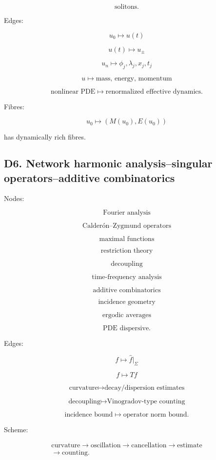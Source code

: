 \documentclass[11pt]{article}
\begin{document}
\[
\text{solitons}.
\]

Edges:

\[
u_0\mapsto u(t)
\]

\[
u(t)\mapsto u_\pm
\]

\[
u_n\mapsto {\phi_j,\lambda_j,x_j,t_j}
\]

\[
u\mapsto \text{mass, energy, momentum}
\]

\[
\text{nonlinear PDE}\mapsto \text{renormalized effective dynamics}.
\]

Fibres:

\[
u_0\mapsto (M(u_0),E(u_0))
\]

has dynamically rich fibres.



\subsection{D6. Network harmonic analysis--singular operators--additive combinatorics}

Nodes:

\[
\text{Fourier analysis}
\]

\[
\text{Calderón--Zygmund operators}
\]

\[
\text{maximal functions}
\]

\[
\text{restriction theory}
\]

\[
\text{decoupling}
\]

\[
\text{time-frequency analysis}
\]

\[
\text{additive combinatorics}
\]

\[
\text{incidence geometry}
\]

\[
\text{ergodic averages}
\]

\[
\text{PDE dispersive}.
\]

Edges:

\[
f\mapsto \widehat f|_\Sigma
\]

\[
f\mapsto Tf
\]

\[
\text{curvature}\mapsto \text{decay/dispersion estimates}
\]

\[
\text{decoupling}\mapsto \text{Vinogradov-type counting}
\]

\[
\text{incidence bound}\mapsto \text{operator norm bound}.
\]

Scheme:

\[
\begin{gathered}
\text{curvature} \to \text{oscillation} \to \text{cancellation} \to \text{estimate} \\
\to \text{counting}.
\end{gathered}
\]
\end{document}
